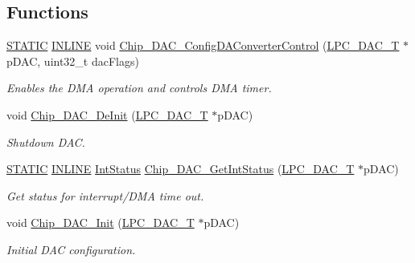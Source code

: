 \subsection*{Functions}
\begin{DoxyCompactItemize}
\item 
\hyperlink{group__LPC__Types__Public__Macros_ga10b2d890d871e1489bb02b7e70d9bdfb}{S\+T\+A\+T\+IC} \hyperlink{group__LPC__Types__Public__Types_ga2eb6f9e0395b47b8d5e3eeae4fe0c116}{I\+N\+L\+I\+NE} void \hyperlink{group__DAC__17XX__40XX_gadd2150c87e3fc28f301417f34a5eb287}{Chip\+\_\+\+D\+A\+C\+\_\+\+Config\+D\+A\+Converter\+Control} (\hyperlink{structLPC__DAC__T}{L\+P\+C\+\_\+\+D\+A\+C\+\_\+T} $\ast$p\+D\+AC, uint32\+\_\+t dac\+Flags)
\begin{DoxyCompactList}\small\item\em Enables the D\+MA operation and controls D\+MA timer. \end{DoxyCompactList}\item 
void \hyperlink{group__DAC__17XX__40XX_gabc7ee03f31b9085f6e77137e7ed1158d}{Chip\+\_\+\+D\+A\+C\+\_\+\+De\+Init} (\hyperlink{structLPC__DAC__T}{L\+P\+C\+\_\+\+D\+A\+C\+\_\+T} $\ast$p\+D\+AC)
\begin{DoxyCompactList}\small\item\em Shutdown D\+AC. \end{DoxyCompactList}\item 
\hyperlink{group__LPC__Types__Public__Macros_ga10b2d890d871e1489bb02b7e70d9bdfb}{S\+T\+A\+T\+IC} \hyperlink{group__LPC__Types__Public__Types_ga2eb6f9e0395b47b8d5e3eeae4fe0c116}{I\+N\+L\+I\+NE} \hyperlink{group__LPC__Types__Public__Types_gab7d263072f745b4f3913fb0afc434c4e}{Int\+Status} \hyperlink{group__DAC__17XX__40XX_ga22cbef1d579da4780f4fb330107eb7cb}{Chip\+\_\+\+D\+A\+C\+\_\+\+Get\+Int\+Status} (\hyperlink{structLPC__DAC__T}{L\+P\+C\+\_\+\+D\+A\+C\+\_\+T} $\ast$p\+D\+AC)
\begin{DoxyCompactList}\small\item\em Get status for interrupt/\+D\+MA time out. \end{DoxyCompactList}\item 
void \hyperlink{group__DAC__17XX__40XX_ga677c6f03e4ea92656c4cb3497fbb4a1b}{Chip\+\_\+\+D\+A\+C\+\_\+\+Init} (\hyperlink{structLPC__DAC__T}{L\+P\+C\+\_\+\+D\+A\+C\+\_\+T} $\ast$p\+D\+AC)
\begin{DoxyCompactList}\small\item\em Initial D\+AC configuration. \end{DoxyCompactList}\item 

\end{DoxyCompactItemize}
